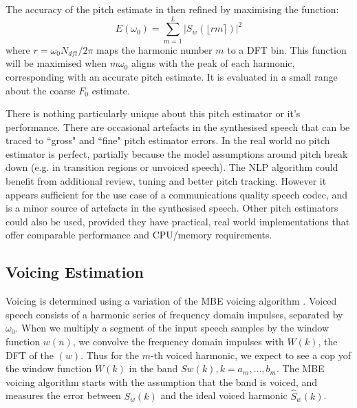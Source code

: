 \documentclass{article}
\begin{document}
The accuracy of the pitch estimate in then refined by maximising the function:
\begin{equation}
E(\omega_0)=\sum_{m=1}^L|S_w(\lfloor r m \rceil)|^2
\end{equation}
where $r=\omega_0 N_{dft}/2 \pi$ maps the harmonic number $m$ to a DFT bin. This function will be maximised when $m \omega_0$ aligns with the peak of each harmonic, corresponding with an accurate pitch estimate.   It is evaluated in a small range about the coarse $F_0$ estimate.

There is nothing particularly unique about this pitch estimator or it's performance. There are occasional artefacts in the synthesised speech that can be traced to ``gross" and ``fine" pitch estimator errors.  In the real world no pitch estimator is perfect, partially because the model assumptions around pitch break down (e.g. in transition regions or unvoiced speech).  The NLP algorithm could benefit from additional review, tuning and better pitch tracking.  However it appears sufficient for the use case of a communications quality speech codec, and is a minor source of artefacts in the synthesised speech. Other pitch estimators could also be used, provided they have practical, real world implementations that offer comparable performance and CPU/memory requirements.

\subsection{Voicing Estimation}

Voicing is determined using a variation of the MBE voicing algorithm \cite{griffin1988multiband}.  Voiced speech consists of a harmonic series of frequency domain impulses, separated by $\omega_0$.  When we multiply a segment of the input speech samples by the window function $w(n)$, we convolve the frequency domain impulses with $W(k)$, the DFT of the $(w)$.  Thus for the $m$-th voiced harmonic, we expect to see a cop yof the window function $W(k)$ in the band $Sw(k), k=a_m,...,b_m$.  The MBE voicing algorithm starts with the assumption that the band is voiced, and measures the error between $S_w(k)$ and the ideal voiced harmonic $\hat{S}_w(k)$.
\end{document}

